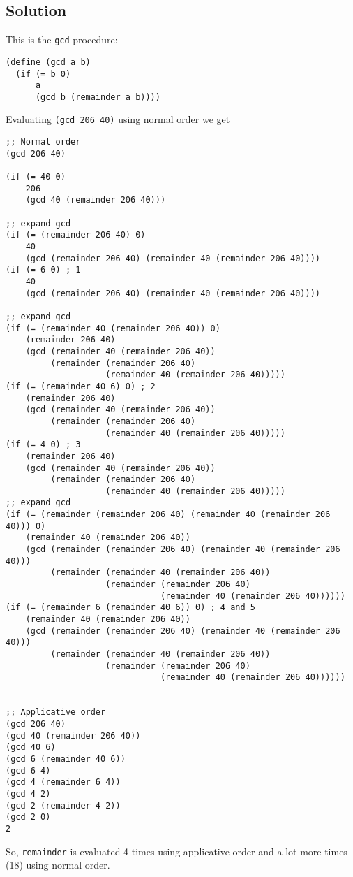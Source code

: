 \documentclass[11pt]{article}
\begin{document}
\subsection{Solution}
\label{sec:orgabd35fe}
This is the \texttt{gcd} procedure:
\begin{verbatim}
(define (gcd a b)
  (if (= b 0)
      a
      (gcd b (remainder a b))))
\end{verbatim}
Evaluating \texttt{(gcd 206 40)} using normal order we get
\begin{verbatim}
;; Normal order
(gcd 206 40)

(if (= 40 0)
    206
    (gcd 40 (remainder 206 40)))

;; expand gcd
(if (= (remainder 206 40) 0)
    40
    (gcd (remainder 206 40) (remainder 40 (remainder 206 40))))
(if (= 6 0) ; 1
    40
    (gcd (remainder 206 40) (remainder 40 (remainder 206 40))))

;; expand gcd
(if (= (remainder 40 (remainder 206 40)) 0)
    (remainder 206 40)
    (gcd (remainder 40 (remainder 206 40))
         (remainder (remainder 206 40)
                    (remainder 40 (remainder 206 40)))))
(if (= (remainder 40 6) 0) ; 2
    (remainder 206 40)
    (gcd (remainder 40 (remainder 206 40))
         (remainder (remainder 206 40)
                    (remainder 40 (remainder 206 40)))))
(if (= 4 0) ; 3
    (remainder 206 40)
    (gcd (remainder 40 (remainder 206 40))
         (remainder (remainder 206 40)
                    (remainder 40 (remainder 206 40)))))
;; expand gcd
(if (= (remainder (remainder 206 40) (remainder 40 (remainder 206 40))) 0)
    (remainder 40 (remainder 206 40))
    (gcd (remainder (remainder 206 40) (remainder 40 (remainder 206 40)))
         (remainder (remainder 40 (remainder 206 40))
                    (remainder (remainder 206 40)
                               (remainder 40 (remainder 206 40))))))
(if (= (remainder 6 (remainder 40 6)) 0) ; 4 and 5
    (remainder 40 (remainder 206 40))
    (gcd (remainder (remainder 206 40) (remainder 40 (remainder 206 40)))
         (remainder (remainder 40 (remainder 206 40))
                    (remainder (remainder 206 40)
                               (remainder 40 (remainder 206 40))))))


;; Applicative order
(gcd 206 40)
(gcd 40 (remainder 206 40))
(gcd 40 6)
(gcd 6 (remainder 40 6))
(gcd 6 4)
(gcd 4 (remainder 6 4))
(gcd 4 2)
(gcd 2 (remainder 4 2))
(gcd 2 0)
2
\end{verbatim}
So, \texttt{remainder} is evaluated 4 times using applicative order and a lot more
times (18) using normal order.
\end{document}
